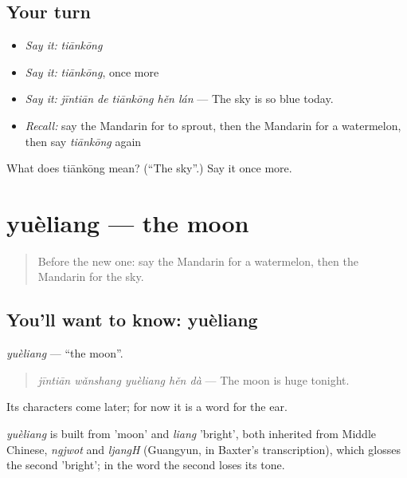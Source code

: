 \subsection*{Your turn}
\begin{itemize}
\raggedright
  \item \emph{Say it:} \emph{tiānkōng}
  \item \emph{Say it:} \emph{tiānkōng}, once more
  \item \emph{Say it:} \emph{jīntiān de tiānkōng hěn lán} — The sky is so blue today.
  \item \emph{Recall:} say the Mandarin for to sprout, then the Mandarin for a watermelon, then say \emph{tiānkōng} again
\end{itemize}

\begin{tcolorbox}[breakable,colback=teal!4,colframe=teal!35!black,title={Before you move on}]
What does tiānkōng mean? (\textquotedblleft{}The sky\textquotedblright{}.) Say it once more.
\end{tcolorbox}
\section[yuèliang]{yuèliang — the moon}

\label{lesson:ZH-C238-yueliang}



\begin{quote}
Before the new one: say the Mandarin for a watermelon, then the Mandarin for the sky.
\end{quote}

\subsection*{You'll want to know: yuèliang}
\emph{yuèliang} — \textquotedblleft{}the moon\textquotedblright{}.

\begin{quote}
\emph{jīntiān wǎnshang yuèliang hěn dà} — The moon is huge tonight.
\end{quote}

Its characters come later; for now it is a word for the ear.

\begin{cousinweb}
\emph{yuèliang} is built from  'moon' and \emph{liang} 'bright', both inherited from Middle Chinese, \emph{ngjwot} and \emph{ljangH} (Guangyun, in Baxter's transcription), which glosses the second 'bright'; in the word the second loses its tone.
\end{cousinweb}


